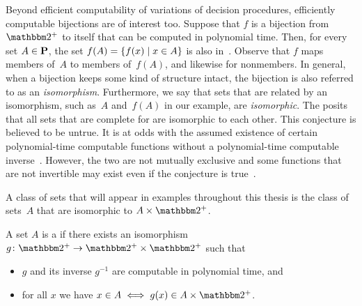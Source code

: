 Beyond efficient computability of variations of decision procedures, efficiently computable bijections are of interest too.
Suppose that $f$ is a bijection from~$\binary^+$ to itself that can be computed in polynomial time.
Then, for every set $A \in \textnormal{\textbf{P}}$, the set $f(A) = \{f(x) \;|\; x \in A\}$ is also in~.
Observe that $f$ maps members of~$A$ to members of~$f(A)$, and likewise for nonmembers.
In general, when a bijection keeps some kind of structure intact, the bijection is also referred to as an \emph{isomorphism}.
Furthermore, we say that sets that are related by an isomorphism, such as~$A$ and~$f(A)$ in our example, are \emph{isomorphic}.
The  \parencite{berman1977isomorphisms} posits that all sets that are complete for  are isomorphic to each other.
This conjecture is believed to be untrue.
It is at odds with the assumed existence of certain polynomial-time computable functions without a polynomial-time computable inverse~\parencite{young1983some,kurtz1989isomorphism}.
However, the two are not mutually exclusive and some functions that are not invertible may exist even if the conjecture is true~\parencite{hartmanis1991one,agrawal2009one}.

A class of sets that will appear in examples throughout this thesis is the class of sets~$A$ that are isomorphic to $A \times \binary^+$.
\begin{definition}
\label{def:p-cylinder}%
  A set $A$ is a  if there exists an isomorphism $g\colon \binary^+ \to \binary^+ \times \binary^+$ such that
  \begin{itemize}
    \item $g$ and its inverse $g^{-1}$ are computable in polynomial time, and
    \item for all $x$ we have $x \in A \iff g(x) \in A \times \binary^+$.
  \end{itemize}
\end{definition}

